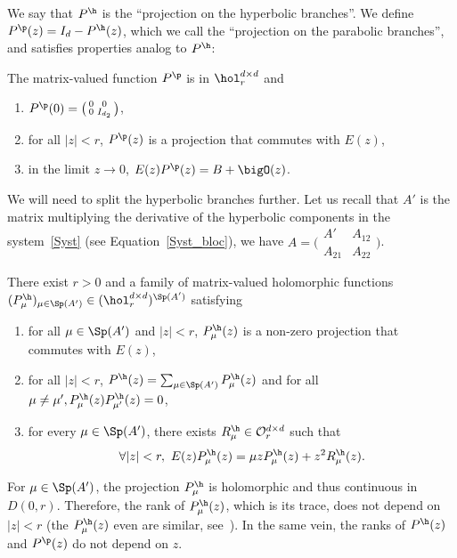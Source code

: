 We say that $P^\h$ is the ``projection on the hyperbolic branches''. We define $P^\p(z) = I_d - P^\h(z)$, which we call the ``projection on the parabolic branches'', and satisfies properties analog to $P^\h$:
\begin{prop}\label{th:perturb_parab}
The matrix-valued function $P^\p$ is in $\hol_{r}^{d\times d}$ and
\begin{enumerate}
\item $P^\p(0) = \big(\begin{smallmatrix}0&0\\0&I_{d_2} \end{smallmatrix} \big)$,
\item for all $|z|<r$, $P^\p(z)$ is a projection that commutes with $E(z)$,
\item in the limit $z\to 0$, $E(z)P^\p(z) = B + \bigO(z)$.
\end{enumerate}
\end{prop}

We will need to split the hyperbolic branches further. Let us recall that $A'$ is the matrix multiplying the derivative of the hyperbolic components in the system~\eqref{Syst} (see Equation~\eqref{Syst_bloc}), \ie we have $A = \big(\begin{smallmatrix}A'&A_{12}\\A_{21}&A_{22}\end{smallmatrix}\big)$.
\begin{prop}\label{th:perturb}
There exist $r>0$ and a family of matrix-valued holomorphic functions $(P_\mu^\h)_{\mu\in\Sp(A')} \in (\hol_{r}^{d\times d})^{\Sp(A')}$ satisfying
\begin{enumerate}
\item
\label{eigenprojection}
for all $\mu \in \Sp(A')$ and $|z|<r$, $P_\mu^\h(z)$ is a non-zero projection that commutes with $E(z)$,
\item
\label{Decompeigenprojection}
for all $|z|<r$, $P^\h(z) = \sum_{\mu \in \Sp(A')} P^\h_\mu(z)$ and for all $\mu\neq \mu', P_\mu^\h(z) P_{\mu'}^\h(z) = 0$,
\item
\label{defAsymHyp}
for every $\mu\in \Sp(A')$, there exists $R_\mu^{\h} \in \mathcal{O}_{r}^{d\times d}$ such that
\begin{equation*}
\forall |z|<r,\ E(z)P_\mu^\h(z) = \mu z P_\mu^\h(z) + z^2R_\mu^\h(z).
\end{equation*}
\end{enumerate}
\end{prop}

\begin{remark}
\label{RmkRk}
For $\mu \in \Sp(A')$, the projection $P_\mu^\h$ is holomorphic and thus continuous in $D(0,r)$. Therefore, the rank of $P_\mu^\h(z)$, which is its trace, does not depend on $|z|<r$ (the $P_\mu^\h(z)$ even are similar, see~\cite[Ch.\,I, \S4.6, Lem.\,4.10]{kato_1995}). In the same vein, the ranks of $P^\h(z)$ and $P^\p(z)$ do not depend on $z$.
\end{remark}

